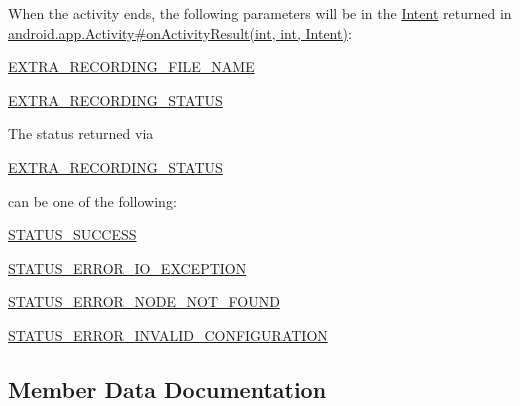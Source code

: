 When the activity ends, the following parameters will be in the \hyperlink{}{Intent} returned in \hyperlink{}{android.\+app.\+Activity\#on\+Activity\+Result(int, int, Intent)}\+: 
\begin{DoxyItemize}
\item \hyperlink{classcom_1_1google_1_1devrel_1_1wcl_1_1widgets_1_1recording_1_1WclRecorderActivity_ad719ab444b60947d01d2f94c4f5e48c7}{E\+X\+T\+R\+A\+\_\+\+R\+E\+C\+O\+R\+D\+I\+N\+G\+\_\+\+F\+I\+L\+E\+\_\+\+N\+A\+ME} 
\item \hyperlink{classcom_1_1google_1_1devrel_1_1wcl_1_1widgets_1_1recording_1_1WclRecorderActivity_a65100261a9067825939ab2f876b1f099}{E\+X\+T\+R\+A\+\_\+\+R\+E\+C\+O\+R\+D\+I\+N\+G\+\_\+\+S\+T\+A\+T\+US} 
\end{DoxyItemize}

The status returned via
\begin{DoxyCode}
\hyperlink{classcom_1_1google_1_1devrel_1_1wcl_1_1widgets_1_1recording_1_1WclRecorderActivity_a65100261a9067825939ab2f876b1f099}{EXTRA\_RECORDING\_STATUS} 
\end{DoxyCode}
 can be one of the following\+: 
\begin{DoxyItemize}
\item \hyperlink{classcom_1_1google_1_1devrel_1_1wcl_1_1widgets_1_1recording_1_1WclRecorderActivity_a4631e92aa0ce773404a1acf457b6aff3}{S\+T\+A\+T\+U\+S\+\_\+\+S\+U\+C\+C\+E\+SS} 
\item \hyperlink{classcom_1_1google_1_1devrel_1_1wcl_1_1widgets_1_1recording_1_1WclRecorderActivity_a7c7ca2a3764cf5e6dc1f73deade0de1a}{S\+T\+A\+T\+U\+S\+\_\+\+E\+R\+R\+O\+R\+\_\+\+I\+O\+\_\+\+E\+X\+C\+E\+P\+T\+I\+ON} 
\item \hyperlink{classcom_1_1google_1_1devrel_1_1wcl_1_1widgets_1_1recording_1_1WclRecorderActivity_a4b4c947e0d87f688749786885282a1f8}{S\+T\+A\+T\+U\+S\+\_\+\+E\+R\+R\+O\+R\+\_\+\+N\+O\+D\+E\+\_\+\+N\+O\+T\+\_\+\+F\+O\+U\+ND} 
\item \hyperlink{classcom_1_1google_1_1devrel_1_1wcl_1_1widgets_1_1recording_1_1WclRecorderActivity_a589e34600557e9c6c53a894e9bc76cd9}{S\+T\+A\+T\+U\+S\+\_\+\+E\+R\+R\+O\+R\+\_\+\+I\+N\+V\+A\+L\+I\+D\+\_\+\+C\+O\+N\+F\+I\+G\+U\+R\+A\+T\+I\+ON} 
\end{DoxyItemize}

\subsection{Member Data Documentation}
